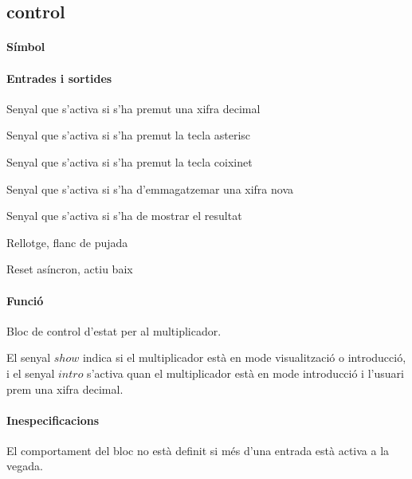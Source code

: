 \subsection{\label{sub:\projectname-control} \textsf{control}}

\paragraph{Símbol}

\begin{center}  \end{center}

\paragraph{Entrades i sortides}

\begin{where}
\item[\nodenamebit{bcd}] Senyal que s'activa si s'ha premut una xifra decimal
\item[\nodenamebit{ast}] Senyal que s'activa si s'ha premut la tecla asterisc
\item[\nodenamebit{coi}] Senyal que s'activa si s'ha premut la tecla coixinet
\item[\nodenamebit{intro}] Senyal que s'activa si s'ha d'emmagatzemar una xifra nova
\item[\nodenamebit{show}] Senyal que s'activa si s'ha de mostrar el resultat
\item[\nodenamebit{clk}] Rellotge, flanc de pujada
\item[\nodenamebit{nrst}] Reset asíncron, actiu baix
\end{where}

\paragraph{Funció}

Bloc de control d'estat per al multiplicador.

El senyal $show$ indica si el multiplicador està en mode visualització o introducció,
i el senyal $intro$ s'activa quan el multiplicador està en mode introducció i l'usuari
prem una xifra decimal.

\paragraph{Inespecificacions}


El comportament del bloc no està definit si més d'una entrada està activa a la vegada.


